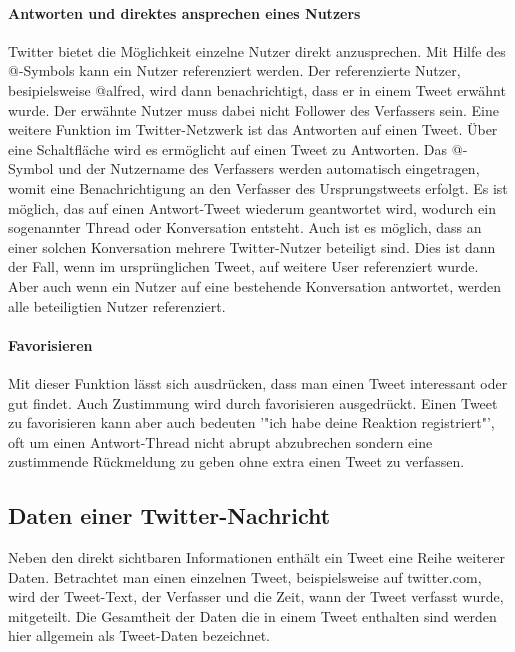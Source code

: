 			\paragraph{Antworten und direktes ansprechen eines Nutzers}
				Twitter bietet die Möglichkeit einzelne Nutzer direkt anzusprechen. 
				Mit Hilfe des @-Symbols kann ein Nutzer referenziert werden. 
				Der referenzierte Nutzer, besipielsweise @alfred, wird dann benachrichtigt, dass er in einem Tweet erwähnt wurde. 
				Der erwähnte Nutzer muss dabei nicht Follower des Verfassers sein.  
				Eine weitere Funktion im Twitter-Netzwerk ist das Antworten auf einen Tweet.
				Über eine Schaltfläche wird es ermöglicht auf einen Tweet zu Antworten. 
				Das @-Symbol und der Nutzername des Verfassers werden automatisch eingetragen, womit eine Benachrichtigung an den Verfasser des Ursprungstweets erfolgt. 
				Es ist möglich, das auf einen Antwort-Tweet wiederum geantwortet wird, wodurch ein sogenannter Thread oder Konversation entsteht. 
				Auch ist es möglich, dass an einer solchen Konversation mehrere Twitter-Nutzer beteiligt sind. 
				Dies ist dann der Fall, wenn im ursprünglichen Tweet, auf weitere User referenziert wurde. 
				Aber auch wenn ein Nutzer auf eine bestehende Konversation antwortet, werden alle beteiligtien Nutzer referenziert. 


			\paragraph{Favorisieren}
				Mit dieser Funktion lässt sich ausdrücken, dass man einen Tweet interessant oder gut findet.
				Auch Zustimmung wird durch favorisieren ausgedrückt.  
				Einen Tweet zu favorisieren kann aber auch bedeuten '"ich habe deine Reaktion registriert"', oft um einen Antwort-Thread nicht abrupt abzubrechen sondern eine zustimmende Rückmeldung zu geben ohne extra einen Tweet zu verfassen.

		\subsection{Daten einer Twitter-Nachricht}
			Neben den direkt sichtbaren Informationen enthält ein Tweet eine Reihe weiterer Daten.
			Betrachtet man einen einzelnen Tweet, beispielsweise auf twitter.com, wird der Tweet-Text, der Verfasser und die Zeit, wann der Tweet verfasst wurde, mitgeteilt.  
			Die Gesamtheit der Daten die in einem Tweet enthalten sind werden hier allgemein als Tweet-Daten bezeichnet.


